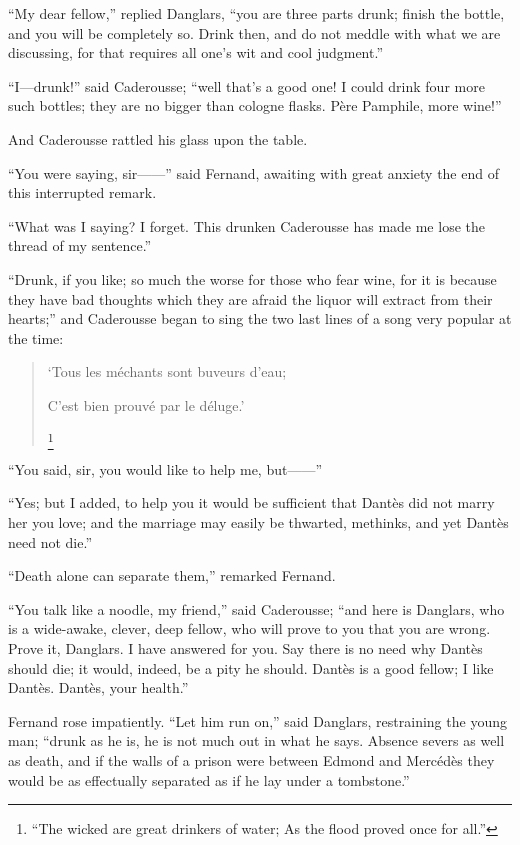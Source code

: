 “My dear fellow,” replied Danglars, “you are three parts drunk; finish
the bottle, and you will be completely so. Drink then, and do not
meddle with what we are discussing, for that requires all one’s wit and
cool judgment.”

“I—drunk!” said Caderousse; “well that’s a good one! I could drink four
more such bottles; they are no bigger than cologne flasks. Père
Pamphile, more wine!”

And Caderousse rattled his glass upon the table.

“You were saying, sir——” said Fernand, awaiting with great anxiety the
end of this interrupted remark.

“What was I saying? I forget. This drunken Caderousse has made me lose
the thread of my sentence.”

“Drunk, if you like; so much the worse for those who fear wine, for it
is because they have bad thoughts which they are afraid the liquor will
extract from their hearts;” and Caderousse began to sing the two last
lines of a song very popular at the time:

\begin{quote}
{\small ‘Tous les méchants sont buveurs d’eau;

C’est bien prouvé par le déluge.’}\footnote[1]{“The wicked
are great drinkers of water; As the flood proved once for all.” }
\end{quote}

“You said, sir, you would like to help me, but——”

“Yes; but I added, to help you it would be sufficient that Dantès did
not marry her you love; and the marriage may easily be thwarted,
methinks, and yet Dantès need not die.”

“Death alone can separate them,” remarked Fernand.

“You talk like a noodle, my friend,” said Caderousse; “and here is
Danglars, who is a wide-awake, clever, deep fellow, who will prove to
you that you are wrong. Prove it, Danglars. I have answered for you.
Say there is no need why Dantès should die; it would, indeed, be a pity
he should. Dantès is a good fellow; I like Dantès. Dantès, your
health.”

Fernand rose impatiently. “Let him run on,” said Danglars, restraining
the young man; “drunk as he is, he is not much out in what he says.
Absence severs as well as death, and if the walls of a prison were
between Edmond and Mercédès they would be as effectually separated as
if he lay under a tombstone.”

